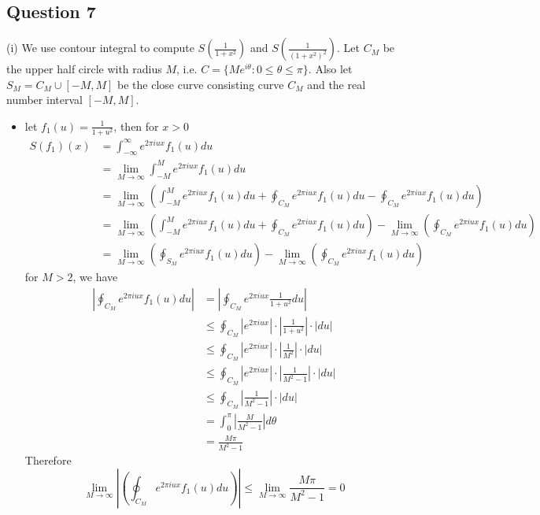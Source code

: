 \documentclass[pdf]{article}
\begin{document}
\subsection{Question 7}
(i) We use contour integral to compute $S(\frac{1}{1+x^2})$ and $S(\frac{1}{(1+x^2)^2})$. Let $C_M$ be the upper half circle with radius $M$, i.e. $C = \{Me^{i\theta}: 0\leq \theta \leq \pi\}$. Also let $S_M = C_M\cup [-M, M]$ be the close curve consisting curve $C_M$ and the real number interval $[-M, M]$.
\begin{itemize}
\item let $f_1(u)=\frac{1}{1+u^2}$, then for $x>0$
\begin{align*}
S(f_1)(x) &= \int_{-\infty}^\infty e^{2\pi iux}f_1(u)du\\
               & = \lim\limits_{M\to\infty}\int_{-M}^Me^{2\pi iux}f_1(u)du\\
               & = \lim\limits_{M\to\infty}(\int_{-M}^Me^{2\pi iux}f_1(u)du + \oint_{C_M}e^{2\pi iux}f_1(u)du - \oint_{C_M}e^{2\pi iux}f_1(u)du)\\
               & = \lim\limits_{M\to\infty}(\int_{-M}^Me^{2\pi iux}f_1(u)du + \oint_{C_M}e^{2\pi iux}f_1(u)du) - \lim\limits_{M\to\infty}(\oint_{C_M}e^{2\pi iux}f_1(u)du)\\
               & = \lim\limits_{M\to\infty}(\oint_{S_M}e^{2\pi iux}f_1(u)du) - \lim\limits_{M\to\infty}(\oint_{C_M}e^{2\pi iux}f_1(u)du)
\end{align*}
for $M>2$, we have
\begin{align*}
|\oint_{C_M}e^{2\pi iux}f_1(u)du| &= |\oint_{C_M}e^{2\pi iux}\frac{1}{1+u^2}du|\\
                                                        &\leq \oint_{C_M}|e^{2\pi iux}|\cdot|\frac{1}{1+u^2}|\cdot|du|\\
                                                        &\leq \oint_{C_M}|e^{2\pi iux}|\cdot|\frac{1}{M^2}|\cdot|du|\\
                                                        &\leq \oint_{C_M}|e^{2\pi iux}|\cdot|\frac{1}{M^2-1}|\cdot|du|\\
                                                        &\leq \oint_{C_M}|\frac{1}{M^2-1}|\cdot|du|\\
                                                        &= \int_0^\pi |\frac{M}{M^2-1}|d\theta\\
                                                        &= \frac{M\pi}{M^2-1}
\end{align*}
Therefore
$$\lim\limits_{M\to\infty}\left|(\oint_{C_M}e^{2\pi iux}f_1(u)du)\right| \leq \lim\limits_{M\to\infty}\frac{M\pi}{M^2-1} = 0 $$

\end{itemize}
\end{document}
